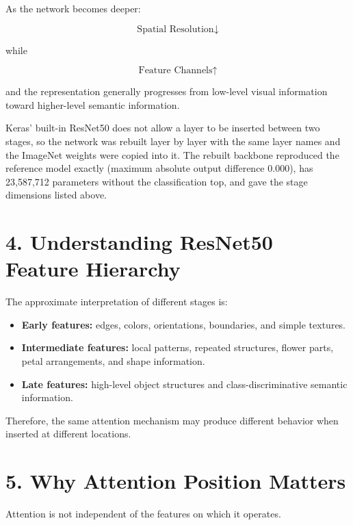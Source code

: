 \documentclass[10pt]{article}
\begin{document}
As the network becomes deeper:

\[
\boxed{
\text{Spatial Resolution}\downarrow
}
\]

while

\[
\boxed{
\text{Feature Channels}\uparrow
}
\]

and the representation generally progresses from low-level visual
information toward higher-level semantic information.

Keras' built-in ResNet50 does not allow a layer to be inserted between two
stages, so the network was rebuilt layer by layer with the same layer names and
the ImageNet weights were copied into it. The rebuilt backbone reproduced the
reference model exactly (maximum absolute output difference $0.000$), has
23{,}587{,}712 parameters without the classification top, and gave the stage
dimensions listed above.

\section*{4. Understanding ResNet50 Feature Hierarchy}

The approximate interpretation of different stages is:

\begin{itemize}

\item \textbf{Early features:}
edges, colors, orientations, boundaries, and simple textures.

\item \textbf{Intermediate features:}
local patterns, repeated structures, flower parts, petal arrangements, and
shape information.

\item \textbf{Late features:}
high-level object structures and class-discriminative semantic information.

\end{itemize}

Therefore, the same attention mechanism may produce different behavior when
inserted at different locations.
\section*{5. Why Attention Position Matters}

Attention is not independent of the features on which it operates.
\end{document}
